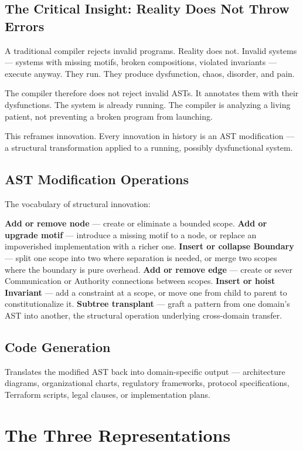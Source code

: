 \documentclass[11pt,a4paper]{article}
\begin{document}
\subsection{The Critical Insight: Reality Does Not Throw Errors}

A traditional compiler rejects invalid programs. Reality does not. Invalid systems --- systems with missing motifs, broken compositions, violated invariants --- execute anyway. They run. They produce dysfunction, chaos, disorder, and pain.

The compiler therefore does not reject invalid ASTs. It annotates them with their dysfunctions. The system is already running. The compiler is analyzing a living patient, not preventing a broken program from launching.

This reframes innovation. Every innovation in history is an AST modification --- a structural transformation applied to a running, possibly dysfunctional system.

\subsection{AST Modification Operations}

The vocabulary of structural innovation:

\textbf{Add or remove node} --- create or eliminate a bounded scope. \textbf{Add or upgrade motif} --- introduce a missing motif to a node, or replace an impoverished implementation with a richer one. \textbf{Insert or collapse Boundary} --- split one scope into two where separation is needed, or merge two scopes where the boundary is pure overhead. \textbf{Add or remove edge} --- create or sever Communication or Authority connections between scopes. \textbf{Insert or hoist Invariant} --- add a constraint at a scope, or move one from child to parent to constitutionalize it. \textbf{Subtree transplant} --- graft a pattern from one domain's AST into another, the structural operation underlying cross-domain transfer.

\subsection{Code Generation}

Translates the modified AST back into domain-specific output --- architecture diagrams, organizational charts, regulatory frameworks, protocol specifications, Terraform scripts, legal clauses, or implementation plans.

\section{The Three Representations}
\end{document}
